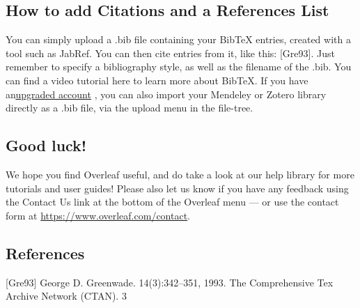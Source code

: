 \documentclass{article}
\begin{document}
\subsection{How to add Citations and a References List}
You can simply upload a .bib file containing your BibTeX entries, created with a tool such as JabRef.
You can then cite entries from it, like this: [Gre93]. Just remember to specify a bibliography style, as
well as the filename of the .bib. You can find a video tutorial here to learn more about BibTeX.
If you have an\href{www.#.com}{upgraded account} , you can also import your Mendeley or Zotero library directly as
a .bib file, via the upload menu in the file-tree.
\subsection{Good luck!}
We hope you find Overleaf useful, and do take a look at our help library for more tutorials and user
guides! Please also let us know if you have any feedback using the Contact Us link at the bottom of
the Overleaf menu — or use the contact form at \href{www.https://www.overleaf.com/contact.com}{https://www.overleaf.com/contact}.
\subsection{References}
[Gre93] George D. Greenwade.
	14(3):342–351, 1993.
	The Comprehensive Tex Archive Network (CTAN).
	3
\end{document}
